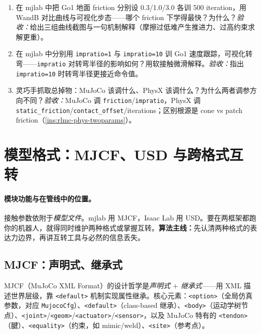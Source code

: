 \begin{practice}[本节练习]
\begin{enumerate}
  \item 在 mjlab 中把 Go1 地面 friction 分别设 0.3/1.0/3.0 各训 500 iteration，用 WandB 对比曲线与可视化步态——哪个 friction 下学得最快？为什么？\emph{验收：}给出三组曲线截图与一句机制解释（摩擦过低难产生推进力、过高约束求解更重）。
  \item 在 mjlab 中分别用 \verb|impratio=1| 与 \verb|impratio=10| 训 Go1 速度跟踪，可视化转弯——\verb|impratio| 对转弯半径的影响如何？用软接触微滑解释。\emph{验收：}指出 \verb|impratio=10| 时转弯半径更接近命令值。
  \item 灵巧手抓取总掉物：MuJoCo 该调什么、PhysX 该调什么？为什么两者调参方向不同？\emph{验收：}MuJoCo 调 \verb|friction|/\verb|impratio|，PhysX 调 \verb|static_friction|/\verb|contact_offset|/iterations；区别根源是 cone vs patch friction（\cref{ins:rlmc-phys-twoparams}）。
\end{enumerate}
\end{practice}

\section{模型格式：MJCF、USD 与跨格式互转}
\label{sec:rlmc-phys-format}

\paragraph{模块功能与在管线中的位置。}接触参数依附于\emph{模型文件}。mjlab 用 MJCF，Isaac Lab 用 USD。要在两框架都跑你的机器人，就得同时维护两种格式或掌握互转。\textbf{算法主线：}先认清两种格式的表达力边界，再讲互转工具与必然的信息丢失。

\subsection{MJCF：声明式、继承式}

MJCF（MuJoCo XML Format）的设计哲学是\emph{声明式 $+$ 继承式}——用 XML 描述世界层级，靠 \verb|<default>| 机制实现属性继承。核心元素：\verb|<option>|（全局仿真参数，对应 \verb|MujocoCfg|）、\verb|<default>|（class-based 继承）、\verb|<body>|（运动学树节点）、\verb|<joint>|/\verb|<geom>|/\verb|<actuator>|/\verb|<sensor>|，以及 MuJoCo 特有的 \verb|<tendon>|（腱）、\verb|<equality>|（约束，如 mimic/weld）、\verb|<site>|（参考点）。

